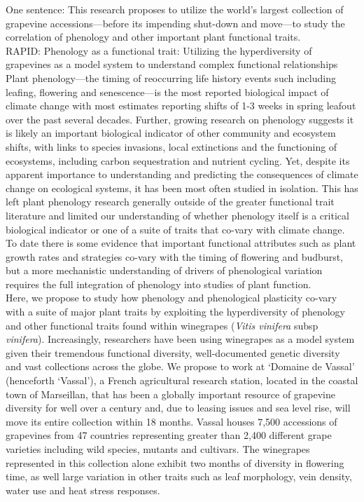 \documentclass[10pt,letter,oneside]{article}
\begin{document}
One sentence: This research proposes to utilize the world's largest collection of grapevine accessions---before its impending shut-down and move---to study the correlation of phenology and other important plant functional traits.\\

RAPID: Phenology as a
 functional trait: Utilizing the hyperdiversity of grapevines as a model system to understand complex functional relationships\\

Plant phenology---the timing of reoccurring life history events such including leafing, flowering and senescence---is the most reported biological impact of climate change with most estimates reporting shifts of 1-3 weeks in spring leafout over the past several decades. Further, growing research on phenology suggests it is likely an important biological indicator of other community and ecosystem shifts, with links to species invasions, local extinctions and the functioning of ecosystems, including carbon sequestration and nutrient cycling. Yet, despite its apparent importance to understanding and predicting the consequences of climate change on ecological systems, it has been most often studied in isolation. This has left plant phenology research generally outside of the greater functional trait literature and limited our understanding of whether phenology itself is a critical biological indicator or one of a suite of traits that co-vary with climate change. To date there is some evidence that important functional attributes such as plant growth rates and strategies co-vary with the timing of flowering and budburst, but a more mechanistic understanding of drivers of phenological variation requires the full integration of phenology into studies of plant function. \\

Here, we propose to study how phenology and phenological plasticity co-vary with a suite of major plant traits by exploiting the hyperdiversity of phenology and other functional traits found within winegrapes (\emph{Vitis vinifera} subsp \emph{vinifera}). Increasingly, researchers have been using winegrapes as a model system given their tremendous functional diversity, well-documented genetic diversity and vast collections across the globe. We propose to work at `Domaine de Vassal' (henceforth `Vassal'), a French agricultural research station, located in the coastal town of Marseillan, that has been a globally important resource of grapevine diversity for well over a century and, due to leasing issues and sea level rise, will move its entire collection within 18 months. Vassal houses 7,500 accessions of grapevines from 47 countries representing greater than 2,400 different grape varieties including wild species, mutants and cultivars. The winegrapes represented in this collection alone exhibit two months of diversity in flowering time, as well large variation in other traits such as leaf morphology, vein density, water use and heat stress responses. \\
\end{document}
